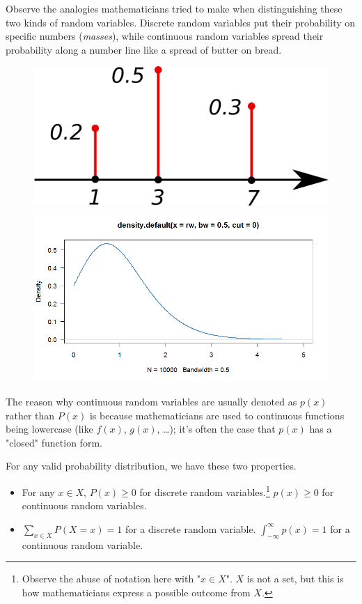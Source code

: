 \documentclass[10pt, leqno]{exam}
\begin{document}
    Observe the analogies mathematicians tried to make when distinguishing
    these two kinds of random variables. Discrete random variables put their
    probability on specific numbers (\textit{masses}), while continuous random variables
    spread their probability along a number line like a spread of butter on bread.
    \begin{figure}[H]
    \centering
    \includegraphics[scale=0.3]{discrete.png}
    \includegraphics[scale=0.3]{continuous.png}
    \end{figure}
    The reason why continuous random variables are usually denoted as $p(x)$
    rather than $P(x)$ is because mathematicians are used to continuous functions
    being lowercase (like $f(x)$, $g(x)$, \dots); it's often the case that $p(x)$
    has a "closed" function form.

    \medskip

    For any valid probability distribution, we have
    these two properties.
    \begin{itemize}
    \item For any $x \in X$, $P(x) \geq 0$ for discrete random variables.\footnote{
    Observe the abuse of notation here with "$x \in X$". $X$ is not a set, but
    this is how mathematicians express a possible outcome from $X$.}
    $p(x) \geq 0$ for continuous random variables.
    \item $\sum_{x \in X} P(X = x) = 1$ for a discrete random variable.
    $\int_{-\infty}^{\infty} p(x) = 1$ for a continuous random variable.
    \end{itemize}
\end{document}
